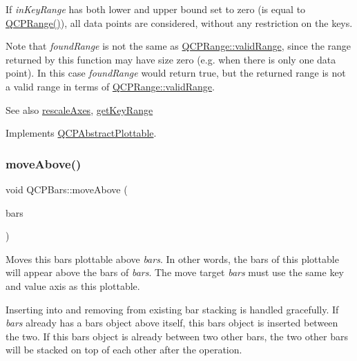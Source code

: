 If {\itshape in\+Key\+Range} has both lower and upper bound set to zero (is equal to {\ttfamily \hyperlink{classQCPRange}{Q\+C\+P\+Range()}}), all data points are considered, without any restriction on the keys.

Note that {\itshape found\+Range} is not the same as \hyperlink{classQCPRange_ab38bd4841c77c7bb86c9eea0f142dcc0}{Q\+C\+P\+Range\+::valid\+Range}, since the range returned by this function may have size zero (e.\+g. when there is only one data point). In this case {\itshape found\+Range} would return true, but the returned range is not a valid range in terms of \hyperlink{classQCPRange_ab38bd4841c77c7bb86c9eea0f142dcc0}{Q\+C\+P\+Range\+::valid\+Range}.

\begin{DoxySeeAlso}{See also}
\hyperlink{classQCPAbstractPlottable_a1491c4a606bccd2d09e65e11b79eb882}{rescale\+Axes}, \hyperlink{classQCPBars_ac5a3854774d9d9cd129b1eae1426de2d}{get\+Key\+Range} 
\end{DoxySeeAlso}


Implements \hyperlink{classQCPAbstractPlottable_a4de773988b21ed090fddd27c6a3a3dcb}{Q\+C\+P\+Abstract\+Plottable}.

\mbox{\label{classQCPBars_ac22e00a6a41509538c21b04f0a57318c}} 
\subsubsection{\texorpdfstring{move\+Above()}{moveAbove()}}
{\footnotesize\ttfamily void Q\+C\+P\+Bars\+::move\+Above (\begin{DoxyParamCaption}\item[{\hyperlink{classQCPBars}{Q\+C\+P\+Bars} $\ast$}]{bars }\end{DoxyParamCaption})}

Moves this bars plottable above {\itshape bars}. In other words, the bars of this plottable will appear above the bars of {\itshape bars}. The move target {\itshape bars} must use the same key and value axis as this plottable.

Inserting into and removing from existing bar stacking is handled gracefully. If {\itshape bars} already has a bars object above itself, this bars object is inserted between the two. If this bars object is already between two other bars, the two other bars will be stacked on top of each other after the operation.

